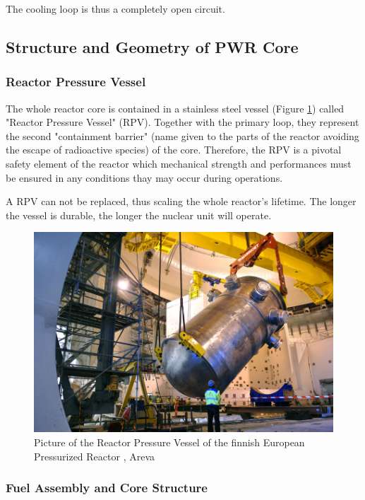 The cooling loop is thus a completely open circuit.


\subsection{Structure and Geometry of PWR Core}


\subsubsection{Reactor Pressure Vessel}

The whole reactor core is contained in a stainless steel vessel (Figure \ref{fig:vessel_pic}) called "Reactor Pressure Vessel" (RPV). Together with the primary loop, they represent the second "containment barrier" (name given to the parts of the reactor avoiding the escape of radioactive species) of the core. Therefore, the RPV is a pivotal safety element of the reactor which mechanical strength and performances must be ensured in any conditions thay may occur during operations.

\begin{note*}{}
A RPV can not be replaced, thus scaling the whole reactor's lifetime. The longer the vessel is durable, the longer the nuclear unit will operate.
\end{note*}




\begin{figure}[!h]
\centering
\includegraphics[width=0.6\linewidth]{img/intro/vessel_pic.jpg}
\caption{Picture of the Reactor Pressure Vessel of the finnish European Pressurized Reactor \cite{nouvelle_cuve_2010}, \textcopyright Areva}
\label{fig:vessel_pic}
\end{figure}

\npar


\subsubsection{Fuel Assembly and Core Structure}

